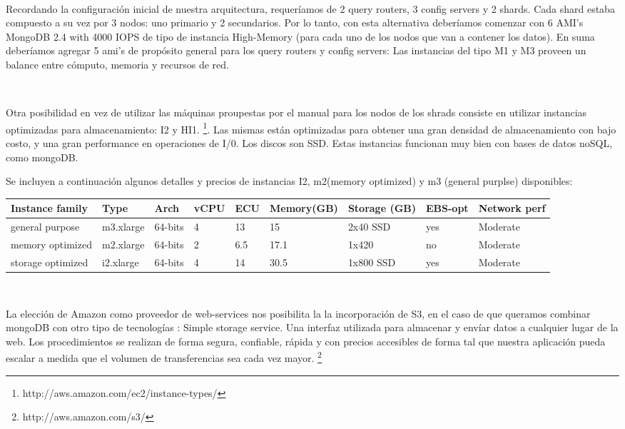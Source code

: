 ~

Recordando la configuración inicial de nuestra arquitectura, requeríamos de 2 query routers, 3 config servers y 2 shards.
Cada shard estaba compuesto a su vez por 3 nodos: uno primario y 2 secundarios. 
Por lo tanto, con esta alternativa deberíamos comenzar con 6 AMI's MongoDB 2.4 with 4000 IOPS de tipo de instancia
High-Memory (para cada uno de los nodos que van a contener los datos). En suma deberíamos agregar 5 ami's de propósito
general para los query routers y config servers: Las instancias del tipo M1 y M3 proveen un balance entre cómputo, 
memoria y recursos de red.

~

Otra posibilidad en vez de utilizar las máquinas proupestas por el manual para los nodos de los shrads
consiste en utilizar instancias
optimizadas para almacenamiento: I2 y HI1. \footnote{http://aws.amazon.com/ec2/instance-types/}. Las mismas están optimizadas
para obtener una gran densidad de almacenamiento con bajo costo, y una gran performance en operaciones de I/0.
Los discos son SSD.
Estas instancias funcionan muy bien con bases de datos noSQL, como mongoDB.

Se incluyen a continuación algunos detalles y precios de instancias I2, m2(memory optimized)
y m3 (general purplse) disponibles:

\begin{center}
    \small{
    \begin{tabular}{| l | l | l | l | l | l | l | l | l |}
    \hline
    Instance family & Type & Arch & vCPU & ECU & Memory(GB) & Storage (GB) & EBS-opt & Network perf\\ \hline
    general purpose & m3.xlarge & 64-bits & 4 & 13 & 15 & 2x40 SSD & yes & Moderate \\ \hline
    memory optimized & m2.xlarge & 64-bits & 2 & 6.5 & 17.1 & 1x420 & no & Moderate \\ \hline 
    storage optimized & i2.xlarge & 64-bits & 4 & 14 & 30.5 & 1x800 SSD & yes & Moderate  \\ \hline
    \end{tabular}
    }
\end{center}

~

La elección de Amazon como proveedor de web-services nos posibilita la 
la incorporación de S3, en el caso de que queramos combinar mongoDB con otro tipo de tecnologías
: Simple storage service. Una interfaz
utilizada para almacenar y envíar datos a cualquier lugar de la web. Los procedimientos se realizan de forma segura,
confiable, rápida y con precios accesibles de forma tal que nuestra aplicación pueda escalar a medida que el volumen
de transferencias sea cada vez mayor. \footnote{http://aws.amazon.com/s3/}

